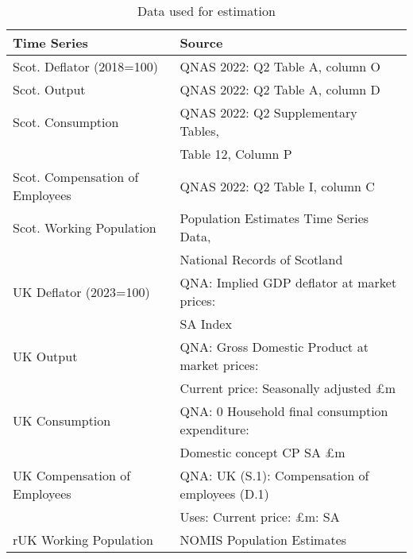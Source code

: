 \begin{table}[H]
    \begin{tabular}{ll}
    \textbf{Time Series} & \textbf{Source}  \\ \hline
    Scot. Deflator (2018=100)         & QNAS 2022: Q2 Table A, column O                                                       \\ 
    Scot. Output                      & QNAS 2022: Q2 Table A, column D                                                       \\
    Scot. Consumption                 & QNAS 2022: Q2 Supplementary Tables, \\& Table 12, Column P                                \\
    Scot. Compensation of Employees & QNAS 2022: Q2 Table I, column C                                                       \\
    Scot. Working Population                & Population Estimates Time Series Data, \\ & National Records of Scotland                   \\
    UK Deflator (2023=100)          & QNA: Implied GDP deflator at market prices: \\ &SA Index                                  \\
    UK Output                       & QNA: Gross Domestic Product at market prices:\\ & Current price: Seasonally adjusted £m   \\
    UK Consumption                  & QNA: 0 Household final consumption expenditure:\\ &Domestic concept CP SA £m             \\
    UK Compensation of Employees  & QNA: UK (S.1): Compensation of employees (D.1) \\ & Uses: Current price: £m: SA            \\
    rUK Working Population                & NOMIS Population Estimates                                                            \\ 
    \end{tabular}
    \caption{Data used for estimation}
    \label{table:data_for_estimation}
\end{table} 